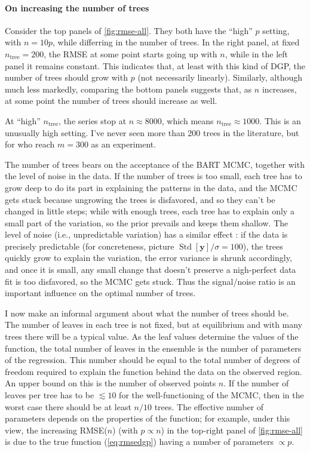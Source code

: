 \documentclass{article}
\begin{document}
    \paragraph{On increasing the number of trees}

    Consider the top panels of \autoref{fig:rmse-all}. They both have the ``high'' $p$ setting, with $n = 10p$, while differring in the number of trees. In the right panel, at fixed $n_\text{tree}=200$, the RMSE at some point starts going up with $n$, while in the left panel it remains constant. This indicates that, at least with this kind of DGP, the number of trees should grow with $p$ (not necessarily linearly). Similarly, although much less markedly, comparing the bottom panels suggests that, as $n$ increases, at some point the number of trees should increase as well.

    At ``high'' $n_\text{tree}$, the series stop at $n\approx 8000$, which means $n_\text{tree}\approx 1000$. This is an unusually high setting. I've never seen more than 200 trees in the literature, but for \textcite[fig.~6, p.~286]{chipman2010} who reach $m=300$ as an experiment.

    The number of trees bears on the acceptance of the BART MCMC, together with the level of noise in the data. If the number of trees is too small, each tree has to grow deep to do its part in explaining the patterns in the data, and the MCMC gets stuck because ungrowing the trees is disfavored, and so they can't be changed in little steps; while with enough trees, each tree has to explain only a small part of the variation, so the prior prevails and keeps them shallow. The level of noise (i.e., unpredictable variation) has a similar effect \autocite{pratola2016}: if the data is precisely predictable (for concreteness, picture $\operatorname{Std}[\mathbf y]/\sigma = 100$), the trees quickly grow to explain the variation, the error variance is shrunk accordingly, and once it is small, any small change that doesn't preserve a nigh-perfect data fit is too disfavored, so the MCMC gets stuck. Thus the signal/noise ratio is an important influence on the optimal number of trees.

    I now make an informal argument about what the number of trees should be. The number of leaves in each tree is not fixed, but at equilibrium and with many trees there will be a typical value. As the leaf values determine the values of the function, the total number of leaves in the ensemble is the number of parameters of the regression. This number should be equal to the total number of degrees of freedom required to explain the function behind the data on the observed region. An upper bound on this is the number of observed points $n$. If the number of leaves per tree has to be $\lesssim 10$ for the well-functioning of the MCMC, then in the worst case there should be at least $n/10$ trees. The effective number of parameters depends on the properties of the function; for example, under this view, the increasing RMSE($n$) (with $p \propto n$) in the top-right panel of \autoref{fig:rmse-all} is due to the true function (\autoref{eq:rmsedgp}) having a number of parameters $\propto p$.
\end{document}
